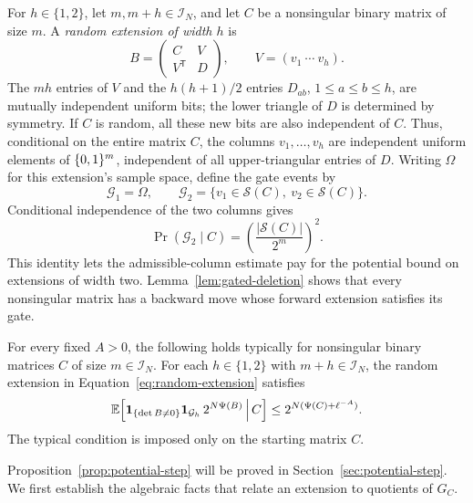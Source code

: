For \(h\in\{1,2\}\), let \(m,m+h\in\mathcal I_N\), and let \(C\) be
a nonsingular binary matrix of size \(m\). A \emph{random extension of
width \(h\)} is
\begin{equation}\label{eq:random-extension}
 B=\begin{pmatrix}C&V\\ V^{\mathsf T}&D\end{pmatrix},
 \qquad V=(v_1\ \cdots\ v_h).
\end{equation}
The \(mh\) entries of \(V\) and the \(h(h+1)/2\) entries \(D_{ab}\),
\(1\le a\le b\le h\), are mutually independent uniform bits; the lower
triangle of \(D\) is determined by symmetry. If \(C\) is random, all
these new bits are also independent of \(C\). Thus, conditional on the
entire matrix \(C\), the columns \(v_1,\ldots,v_h\) are independent
uniform elements of \(\{0,1\}^m\), independent of all upper-triangular
entries of \(D\). Writing \(\Omega\) for this extension's sample space,
define the gate events by
\begin{equation}\label{eq:extension-gate}
 \mathcal G_1=\Omega,\qquad
 \mathcal G_2=\{v_1\in\mathcal S(C),\ v_2\in\mathcal S(C)\}.
\end{equation}
Conditional independence of the two columns gives
\begin{equation}\label{eq:gate-probability}
 \Pr(\mathcal G_2\mid C)=\left(\frac{|\mathcal S(C)|}{2^m}\right)^2.
\end{equation}
This identity lets the admissible-column estimate pay for the potential
bound on extensions of width two.
Lemma~\ref{lem:gated-deletion} shows that every nonsingular matrix has a
backward move whose forward extension satisfies its gate.

\begin{proposition}\label{prop:potential-step}
For every fixed \(A>0\), the following holds typically for nonsingular
binary matrices \(C\) of size \(m\in\mathcal I_N\). For each
\(h\in\{1,2\}\) with \(m+h\in\mathcal I_N\), the random extension
in Equation~\eqref{eq:random-extension} satisfies
\begin{equation}\label{eq:potential-step}
 \mathbb E\!\left[
   \mathbf 1_{\{\det B\ne0\}}\mathbf 1_{\mathcal G_h}\,2^{N\Psi(B)}
   \,\middle|\, C\right]
 \le 2^{N(\Psi(C)+\ell^{-A})}.
\end{equation}
The typical condition is imposed only on the starting matrix \(C\).
\end{proposition}

Proposition~\ref{prop:potential-step} will be proved in
Section~\ref{sec:potential-step}. We first establish the algebraic facts
that relate an extension to quotients of \(G_C\).


